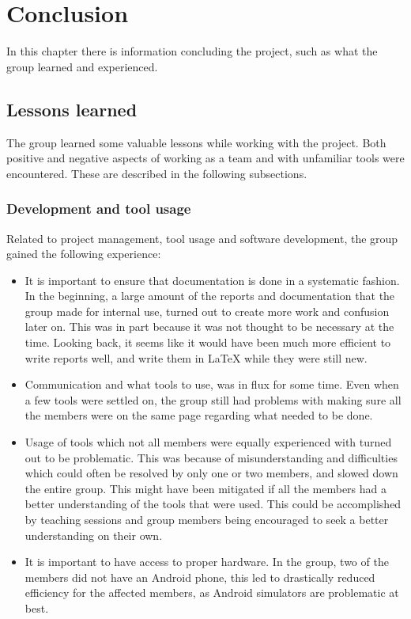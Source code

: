 \chapter{Conclusion}
In this chapter there is information concluding the project, such as what the group learned and experienced.
\section{Lessons learned}
The group learned some valuable lessons while working with the project. Both positive and negative aspects of working as a team and with unfamiliar tools were encountered. These are described in the following subsections.
\subsection{Development and tool usage}
Related to project management, tool usage and software development, the group gained the following experience:
\begin{itemize}
 \item  It is important to ensure that documentation is done in a systematic fashion. In the beginning, a large amount of the reports and documentation that the group made for internal use, turned out to create more work and confusion later on. This was in part because it was not thought to be necessary at the time. Looking back, it seems like it would have been much more efficient to write reports well, and write them in LaTeX  while they were still new.
 \item Communication and what tools to use, was in flux for some time. Even when a few tools were settled on, the group still had problems with making sure all the members were on the same page regarding what needed to be done. 
 \item  Usage of tools which not all members were equally experienced with turned out to be problematic. This was because of misunderstanding and difficulties which could often be resolved by only one or two members, and slowed down the entire group. This might have been mitigated if all the members had a better understanding of the tools that were used. This could be accomplished by teaching sessions and group members being encouraged to seek a better understanding on their own.
 \item It is important to have access to proper hardware. In the group, two of the members did not have an Android phone, this led to drastically reduced efficiency for the affected members, as Android simulators are problematic at best.
\end{itemize} 

